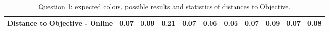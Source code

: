 \begin{table}[H]
{\begin{tabular}{lccccccccccccc}
    \multicolumn{4}{l}{Distance to Objective - Online}                                                                                               & \multicolumn{1}{|c}{0.07}       & \multicolumn{1}{c|}{0.09}    & \multicolumn{1}{|c}{0.21}       & \multicolumn{1}{c|}{0.07}    & \multicolumn{1}{|c}{\textbf{0.06}}       & \multicolumn{1}{c|}{0.06}    & \multicolumn{1}{|c}{0.07}       & \multicolumn{1}{c|}{0.09}    & \multicolumn{1}{|c}{0.07}       & \multicolumn{1}{c|}{0.08}    \\ \hline
    \end{tabular}}
  \caption[Question 1, with expected Results.]{Question 1: expected colors, possible results and statistics of distances to Objective.}
  \vspace{-5pt}
  \label{table:lab_q1_expected}
\end{table}
%
